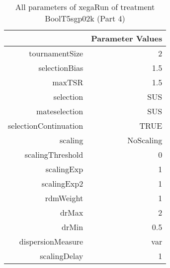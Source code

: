 \begin{table}[ht]
\centering
\begin{tabular}{rr}
  \hline
 & Parameter Values \\ 
  \hline
tournamentSize & 2 \\ 
  selectionBias & 1.5 \\ 
  maxTSR & 1.5 \\ 
  selection & SUS \\ 
  mateselection & SUS \\ 
  selectionContinuation & TRUE \\ 
  scaling & NoScaling \\ 
  scalingThreshold & 0 \\ 
  scalingExp & 1 \\ 
  scalingExp2 & 1 \\ 
  rdmWeight & 1 \\ 
  drMax & 2 \\ 
  drMin & 0.5 \\ 
  dispersionMeasure & var \\ 
  scalingDelay & 1 \\ 
   \hline
\end{tabular}
\caption{ All parameters of xegaRun of treatment BoolT5sgp02k 
 (Part 4)} 
\end{table}

